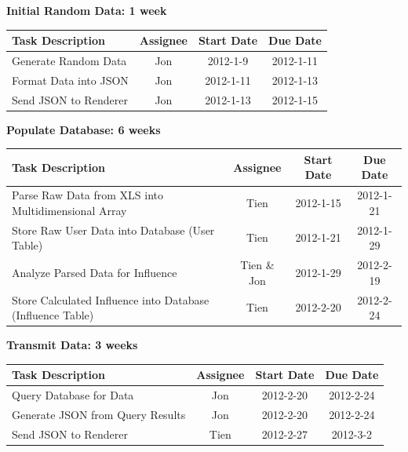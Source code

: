 \documentclass[12pt, letterpaper]{article}
\begin{document}
  \begin{center}
		{\bf Initial Random Data: 1 week}
    \begin{tabular}{| p{8.3cm} || c | c | c | }
      \hline
      Task Description & Assignee & Start Date & Due Date \\
      \hline
	    Generate Random Data & Jon & 2012-1-9 & 2012-1-11 \\
	    Format Data into JSON & Jon & 2012-1-11 & 2012-1-13 \\
	    Send JSON to Renderer & Jon & 2012-1-13 & 2012-1-15 \\
      \hline
    \end{tabular}
  \end{center}

  \begin{center}
		{\bf Populate Database: 6 weeks}
    \begin{tabular}{| p{8.3cm} || c | c | c | }
      \hline
      Task Description & Assignee & Start Date & Due Date \\
      \hline
	    Parse Raw Data from XLS into Multidimensional Array & Tien & 2012-1-15 & 2012-1-21 \\
        Store Raw User Data into Database (User Table) & Tien & 2012-1-21 & 2012-1-29 \\
	    Analyze Parsed Data for Influence & Tien \& Jon & 2012-1-29 & 2012-2-19 \\
        Store Calculated Influence into Database (Influence Table) & Tien & 2012-2-20 & 2012-2-24 \\
      \hline
    \end{tabular}
  \end{center}

  \begin{center}
		{\bf Transmit Data: 3 weeks}
    \begin{tabular}{| p{8.3cm} || c | c | c | }
      \hline
      Task Description & Assignee & Start Date & Due Date \\
      \hline
	    Query Database for Data & Jon & 2012-2-20 & 2012-2-24 \\
	    Generate JSON from Query Results & Jon & 2012-2-20 & 2012-2-24 \\
	    Send JSON to Renderer & Tien & 2012-2-27 & 2012-3-2 \\
      \hline
    \end{tabular}
  \end{center}
  
\end{document}
